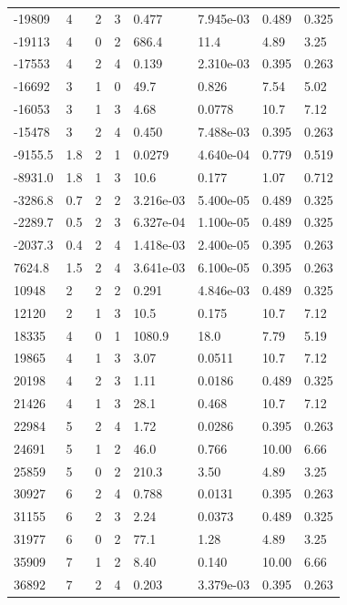 \documentclass[preview]{standalone}
\begin{document}
{{\begin{tabular}{L{1.2cm}C{1.2cm} C{0.3cm}C{0.5cm} C{1.4cm}C{1.4cm} C{1.4cm}C{1.4cm}}
  -19809  &     4  & 2     &  3 &  0.477  & 7.945e-03  & 0.489 &  0.325   \\ 
  -19113  &     4  & 0     &  2 &  686.4  & 11.4  & 4.89 &  3.25   \\ 
  -17553  &     4  & 2     &  4 &  0.139  & 2.310e-03  & 0.395 &  0.263   \\ 
  -16692  &     3  & 1     &  0 &  49.7  & 0.826  & 7.54 &  5.02   \\ 
  -16053  &     3  & 1     &  3 &  4.68  & 0.0778  & 10.7 &  7.12   \\ 
  -15478  &     3  & 2     &  4 &  0.450  & 7.488e-03  & 0.395 &  0.263   \\ 
  -9155.5  &   1.8  & 2     &  1 &  0.0279  & 4.640e-04  & 0.779 &  0.519   \\ 
  -8931.0  &   1.8  & 1     &  3 &  10.6  & 0.177  & 1.07 &  0.712   \\ 
  -3286.8  &   0.7  & 2     &  2 &  3.216e-03  & 5.400e-05  & 0.489 &  0.325   \\ 
  -2289.7  &   0.5  & 2     &  3 &  6.327e-04  & 1.100e-05  & 0.489 &  0.325   \\ 
  -2037.3  &   0.4  & 2     &  4 &  1.418e-03  & 2.400e-05  & 0.395 &  0.263   \\ 
  7624.8  &   1.5  & 2     &  4 &  3.641e-03  & 6.100e-05  & 0.395 &  0.263   \\ 
  10948  &     2  & 2     &  2 &  0.291  & 4.846e-03  & 0.489 &  0.325   \\ 
  12120  &     2  & 1     &  3 &  10.5  & 0.175  & 10.7 &  7.12   \\ 
  18335  &     4  & 0     &  1 &  1080.9  & 18.0  & 7.79 &  5.19   \\ 
  19865  &     4  & 1     &  3 &  3.07  & 0.0511  & 10.7 &  7.12   \\ 
  20198  &     4  & 2     &  3 &  1.11  & 0.0186  & 0.489 &  0.325   \\ 
  21426  &     4  & 1     &  3 &  28.1  & 0.468  & 10.7 &  7.12   \\ 
  22984  &     5  & 2     &  4 &  1.72  & 0.0286  & 0.395 &  0.263   \\ 
  24691  &     5  & 1     &  2 &  46.0  & 0.766  & 10.00 &  6.66   \\ 
  25859  &     5  & 0     &  2 &  210.3  & 3.50  & 4.89 &  3.25   \\ 
  30927  &     6  & 2     &  4 &  0.788  & 0.0131  & 0.395 &  0.263   \\ 
  31155  &     6  & 2     &  3 &  2.24  & 0.0373  & 0.489 &  0.325   \\ 
  31977  &     6  & 0     &  2 &  77.1  & 1.28  & 4.89 &  3.25   \\ 
  35909  &     7  & 1     &  2 &  8.40  & 0.140  & 10.00 &  6.66   \\ 
  36892  &     7  & 2     &  4 &  0.203  & 3.379e-03  & 0.395 &  0.263   \\ 
\hline 
\end{tabular} 

}}
\end{document}
